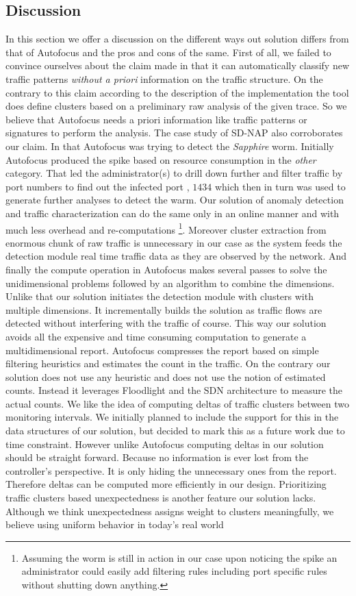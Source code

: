 \documentclass[twocolumn]{article}
\begin{document}
\subsection{Discussion}
In this section we offer a discussion on the different ways out solution differs from that of Autofocus and the pros and cons of the same. First of all, we failed to convince ourselves about the claim made in \cite{autofocus} that it can automatically classify new traffic patterns \emph{without a priori} information on the traffic structure. On the contrary to this claim according to the description of the implementation the tool does define clusters based on a preliminary raw analysis of the given trace. So we believe that Autofocus needs a priori information like traffic patterns or signatures to perform the analysis. The case study of SD-NAP also corroborates our claim. In that Autofocus was trying to detect the \emph{Sapphire} worm. Initially Autofocus produced the spike based on resource consumption in the \emph{other} category. That led the administrator(s) to drill down further and filter traffic by port numbers to find out the infected port , $1434$ which then in turn was used to generate further analyses to detect the warm. Our solution of anomaly detection and traffic characterization can do the same only in an online manner and with much less overhead and re-computations \footnote{Assuming the worm is still in action in our case upon noticing the spike an administrator could easily add filtering rules including port specific rules without shutting down anything.}. Moreover cluster extraction from enormous chunk of raw traffic is unnecessary in our case as the system feeds the detection module real time traffic data as they are observed by the network. And finally the compute operation in Autofocus makes several passes to solve the unidimensional problems followed by an algorithm to combine the dimensions. Unlike that our solution initiates the detection module with clusters with multiple dimensions. It incrementally builds the solution as traffic flows are detected without interfering with the traffic of course. This way our solution avoids all the expensive and time consuming computation to generate a multidimensional report.  Autofocus compresses the report based on simple filtering heuristics and estimates the count in the traffic. On the contrary our solution does not use any heuristic and does not use the notion of estimated counts. Instead it leverages Floodlight and the SDN architecture to measure the actual counts. We like the idea of computing deltas of traffic clusters between two monitoring intervals. We initially planned to include the support for this in the data structures of our solution, but decided to mark this as a future work due to time constraint. However unlike Autofocus computing deltas in our solution should be straight forward. Because no information is ever lost from the controller\rq{}s perspective. It is only hiding the unnecessary ones from the report. Therefore deltas can be computed more efficiently in our design. Prioritizing traffic clusters based unexpectedness is another feature our solution lacks. Although we think unexpectedness assigns weight to clusters meaningfully, we believe using uniform behavior in today\rq{}s real world 
\end{document}
